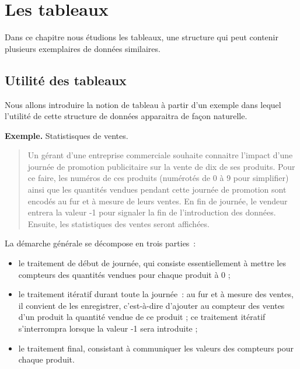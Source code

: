 \chapter{Les tableaux}

	Dans ce chapitre nous étudions les tableaux, 
	une structure qui peut contenir 
	plusieurs exemplaires de données similaires.

	\section{Utilité des tableaux}
	
		Nous allons introduire la notion de tableau à partir d’un exemple 
		dans lequel l’utilité de cette structure de données 
		apparaitra de façon naturelle.
	
		\textbf{Exemple.}
		Statistisques de ventes.
		\begin{quote}	
			Un gérant d’une entreprise commerciale 
			souhaite connaitre l’impact 
			d’une journée de promotion publicitaire 
			sur la vente de dix de ses produits.
			Pour ce faire, les numéros de ces produits 
			(numérotés de 0 à 9 pour simplifier) 
			ainsi que les quantités vendues 
			pendant cette journée de promotion 
			sont encodés au fur et à mesure de leurs ventes. 
			En fin de journée, 
			le vendeur entrera la valeur -1 
			pour signaler la fin de l’introduction des données. 
			Ensuite, les statistiques des ventes seront affichées.
		\end{quote}
	
		La démarche générale se décompose en trois parties~:
		\begin{itemize}
		\item
			le traitement de début de journée, qui consiste essentiellement à mettre
			les compteurs des quantités vendues pour chaque produit à 0 ;
		\item
			le traitement itératif durant toute la journée~: 
			au fur et à mesure des ventes, 
			il convient de les enregistrer, 
			c’est-à-dire d’ajouter au compteur des ventes d’un produit 
			la quantité vendue de ce produit ; 
			ce traitement itératif s’interrompra 
			lorsque la valeur -1 sera introduite ;
		\item
			le traitement final, consistant à communiquer les valeurs des compteurs
			pour chaque produit.
		\end{itemize}
	
